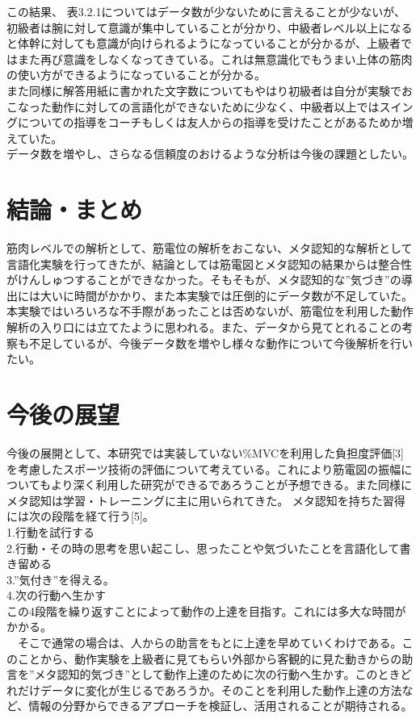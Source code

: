 \documentclass[11pt,a4j,notitlepage]{jreport}
\begin{document}
この結果、 表3.2.1についてはデータ数が少ないために言えることが少ないが、初級者は腕に対して意識が集中していることが分かり、中級者レベル以上になると体幹に対しても意識が向けられるようになっていることが分かるが、上級者ではまた再び意識をしなくなってきている。これは無意識化でもうまい上体の筋肉の使い方ができるようになっていることが分かる。\\

また同様に解答用紙に書かれた文字数についてもやはり初級者は自分が実験でおこなった動作に対しての言語化ができないために少なく、中級者以上ではスイングについての指導をコーチもしくは友人からの指導を受けたことがあるためか増えていた。\\
データ数を増やし、さらなる信頼度のおけるような分析は今後の課題としたい。


\chapter{結論・まとめ}
筋肉レベルでの解析として、筋電位の解析をおこない、メタ認知的な解析として言語化実験を行ってきたが、結論としては筋電図とメタ認知の結果からは整合性がけんしゅつすることができなかった。そもそもが、メタ認知的な”気づき”の導出には大いに時間がかかり、また本実験では圧倒的にデータ数が不足していた。本実験ではいろいろな不手際があったことは否めないが、筋電位を利用した動作解析の入り口には立てたように思われる。また、データから見てとれることの考察も不足しているが、今後データ数を増やし様々な動作について今後解析を行いたい。


\chapter{今後の展望}
今後の展開として、本研究では実装していない\%MVCを利用した負担度評価[3]を考慮したスポーツ技術の評価について考えている。これにより筋電図の振幅についてもより深く利用した研究ができるであろうことが予想できる。また同様に
メタ認知は学習・トレーニングに主に用いられてきた。 メタ認知を持ちた習得には次の段階を経て行う[5]。\\
1.行動を試行する\\
2.行動・その時の思考を思い起こし、思ったことや気づいたことを言語化して書き留める\\
3.”気付き”を得える。\\
4.次の行動へ生かす\\
この4段階を繰り返すことによって動作の上達を目指す。これには多大な時間がかかる。\\
　そこで通常の場合は、人からの助言をもとに上達を早めていくわけである。このことから、動作実験を上級者に見てもらい外部から客観的に見た動きからの助言を”メタ認知的気づき”として動作上達のために次の行動へ生かす。このときどれだけデータに変化が生じるであろうか。そのことを利用した動作上達の方法など、情報の分野からできるアプローチを検証し、活用されることが期待される。
\end{document}

